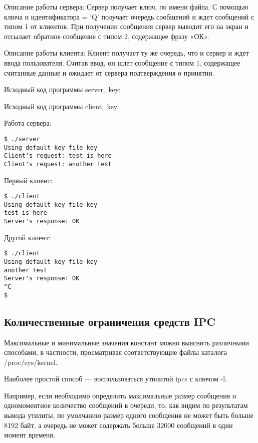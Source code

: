 \documentclass[a4paper]{article}
\begin{document}
	Описание работы сервера: Сервер получает ключ, по имени файла. С помощью ключа и идентификатора = 'Q' получает очередь сообщений и ждет сообщений с типом 1 от клиентов. При получении сообщения сервер выводит его на экран и отсылает обратное сообщение с типом 2, содержащее фразу «ОК».

	Описание работы клиента: Клиент получает ту же очередь, что и сервер и ждет ввода пользователя. Считав ввод, он шлет сообщение с типом 1, содержащее считанные данные и ожидает от сервера подтверждения о принятии.
	
	Исходный код программы server\_key:
	

		
	Исходный код программы client\_key
	
	
	Работа сервера:
	\begin{lstlisting}[style=crs_bash]
$ ./server    
Using default key file key
Client's request: test_is_here
Client's request: another test
	\end{lstlisting}
	
	Первый клиент:
	\begin{lstlisting}[style=crs_bash]
$ ./client 
Using default key file key
test_is_here
Server's response: OK

	\end{lstlisting}
	
	Другой клиент:
	\begin{lstlisting}[style=crs_bash]
$ ./client 
Using default key file key
another test
Server's response: OK
^C
$
	\end{lstlisting}
	
\subsection{Количественные ограничения средств IPC}
\label{IPClimits}
	Максимальные и минимальные значения констант можно выяснить различными способами, в частности, просматривая соответствующие файлы каталога /proc/sys/kernel.
	
	Наиболее простой способ --– воспользоваться утилитой ipcs с ключом -l.
	
	
	Например, если необходимо определить максимальные размер сообщения и одномоментное количество сообщений в очереди, то, как видим по результатам вывода утилиты, по умолчанию размер одного сообщения не может быть больше 8192 байт, а очередь не может содержать больше 32000 сообщений в один момент времени.
	
\end{document}
